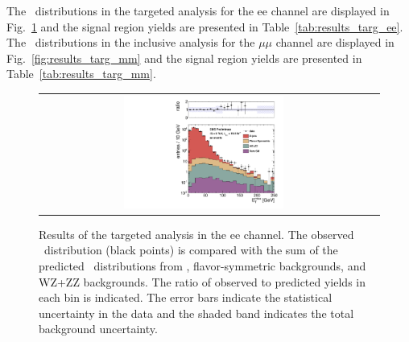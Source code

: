 \begin{table}[htb]
\begin{center}
\begin{tabular}{l|c|c|c|c|c|c}


\end{tabular}
\end{center}
\end{table}


\clearpage

The \MET\ distributions in the targeted analysis for the ee channel are displayed in Fig.~\ref{fig:results_targ_ee} and 
the signal region yields are presented in Table~\ref{tab:results_targ_ee}.
The \MET\ distributions in the inclusive analysis for the $\mu\mu$ channel are displayed in Fig.~\ref{fig:results_targ_mm} and 
the signal region yields are presented in Table~\ref{tab:results_targ_mm}.

\begin{figure}[!h]
\begin{center}
\begin{tabular}{cc}
\includegraphics[width=0.5\textwidth]{plots/pfmet_bveto_ee_19p5fb.pdf}
\end{tabular}
\caption{Results of the targeted analysis in the ee channel. The observed \MET\ distribution (black points) is compared with the sum of the predicted \MET\
distributions from \zjets, flavor-symmetric backgrounds, and WZ+ZZ backgrounds. The ratio of observed to predicted yields in each bin is
indicated. The error bars indicate the statistical uncertainty in the data and the shaded band indicates the total background uncertainty.
\label{fig:results_targ_ee}
}
\end{center}
\end{figure}



